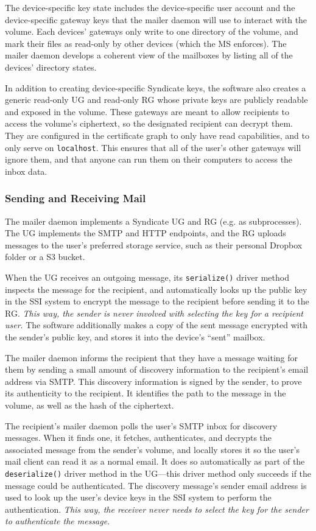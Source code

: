 The device-specific key state includes the device-specific user account and the
device-specific gateway keys that the mailer daemon will use to interact with
the volume.  Each devices' gateways only write to one directory of the volume,
and mark their files as read-only by other devices (which the MS enforces).
The mailer daemon develops a coherent view of the mailboxes by listing all of
the devices' directory states.

In addition to creating device-specific Syndicate keys, the software also
creates a generic read-only UG and read-only RG whose private keys are publicly readable
and exposed in the volume.  These gateways are meant to allow recipients to access
the volume's ciphertext, so the designated recipient can decrypt them.
They are configured in the certificate graph to only have read capabilities, and
to only serve on \texttt{localhost}.  This ensures that all of the user's other
gateways will ignore them, and that anyone can run them on their computers to
access the inbox data.

\subsubsection{Sending and Receiving Mail}

The mailer daemon implements a Syndicate UG and RG (e.g. as subprocesses).
The UG implements the SMTP
and HTTP endpoints, and the RG uploads messages to the user's preferred storage
service, such as their personal Dropbox folder or a S3 bucket.

When the UG receives an outgoing message, its \texttt{serialize()} driver method inspects the
message for the recipient, and automatically looks up the public key in the SSI
system to encrypt the message to the recipient before sending it to the RG.
\emph{This way, the sender is never involved with selecting the key for a
recipient user}.  The software additionally makes a copy of the sent message encrypted with the
sender's public key, and stores it into the device's ``sent'' mailbox.

The mailer daemon informs the recipient that they have a message waiting for
them by sending a small amount of discovery information to the recipient's
email address via SMTP.  This discovery information is signed by the sender,
to prove its authenticity to the recipient.  It identifies the path to the
message in the volume, as well as the hash of the ciphertext.

The recipient's mailer daemon polls the user's SMTP inbox for discovery
messages.  When it finds one, it fetches, authenticates, and decrypts the
associated message from the sender's volume,
and locally stores it so the user's mail client can read it as a normal
email.  It does so automatically as part of the \texttt{deserialize()} driver
method in the UG---this driver method only succeeds if the message could be
authenticated.  The discovery message's sender email address
is used to look up the user's device keys in the SSI system to perform the authentication.
\emph{This way, the receiver never needs to select the key for the
sender to authenticate the message}.

